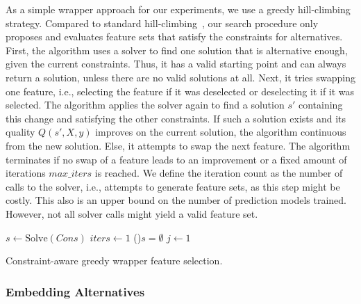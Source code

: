 \documentclass{article}
\theoremstyle{definition}
\begin{document}
As a simple wrapper approach for our experiments, we use a greedy hill-climbing strategy.
Compared to standard hill-climbing~\cite{kohavi1997wrappers}, our search procedure only proposes and evaluates feature sets that satisfy the constraints for alternatives.
First, the algorithm uses a solver to find one solution that is alternative enough, given the current constraints.
Thus, it has a valid starting point and can always return a solution, unless there are no valid solutions at all.
Next, it tries swapping one feature, i.e., selecting the feature if it was deselected or deselecting it if it was selected.
The algorithm applies the solver again to find a solution $s'$ containing this change and satisfying the other constraints.
If such a solution exists and its quality $Q(s',X,y)$ improves on the current solution, the algorithm continuous from the new solution.
Else, it attempts to swap the next feature.
The algorithm terminates if no swap of a feature leads to an improvement or a fixed amount of iterations $max\_iters$ is reached.
We define the iteration count as the number of calls to the solver, i.e., attempts to generate feature sets, as this step might be costly.
This also is an upper bound on the number of prediction models trained.
However, not all solver calls might yield a valid feature set.

\begin{algorithm}[htb]
	\DontPrintSemicolon
	\BlankLine
	$s \leftarrow \text{Solve}(Cons)$ 
	$iters \leftarrow 1$ 
	\If(){$s = \emptyset$}{
		\Return{$\emptyset$}
	}
	$j \leftarrow 1$ 
	\caption{Constraint-aware greedy wrapper feature selection.}
	\label{al:greedy-wrapper}
\end{algorithm}

\subsubsection{Embedding Alternatives}
\label{sec:approach:objectives:embedding}
\end{document}
